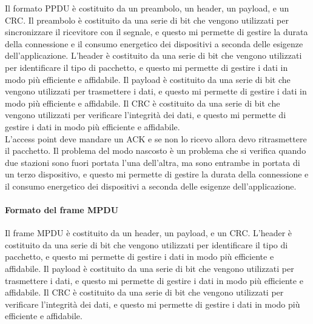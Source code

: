 Il formato PPDU è costituito da un preambolo, un header, un payload, e un CRC. Il preambolo è costituito da una serie di bit che vengono utilizzati per sincronizzare il ricevitore con il segnale, e questo mi permette di gestire la durata della connessione e il consumo energetico dei dispositivi a seconda delle esigenze dell'applicazione. L'header è costituito da una serie di bit che vengono utilizzati per identificare il tipo di pacchetto, e questo mi permette di gestire i dati in modo più efficiente e affidabile. Il payload è costituito da una serie di bit che vengono utilizzati per trasmettere i dati, e questo mi permette di gestire i dati in modo più efficiente e affidabile. Il CRC è costituito da una serie di bit che vengono utilizzati per verificare l'integrità dei dati, e questo mi permette di gestire i dati in modo più efficiente e affidabile.\\

L'access point deve mandare un ACK e se non lo ricevo allora devo ritrasmettere il pacchetto.
Il problema del modo nascosto è un problema che si verifica quando due stazioni sono fuori portata l'una dell'altra, ma sono entrambe in portata di un terzo dispositivo, e questo mi permette di gestire la durata della connessione e il consumo energetico dei dispositivi a seconda delle esigenze dell'applicazione.\\

\paragraph{Formato del frame MPDU}
Il frame MPDU è costituito da un header, un payload, e un CRC. L'header è costituito da una serie di bit che vengono utilizzati per identificare il tipo di pacchetto, e questo mi permette di gestire i dati in modo più efficiente e affidabile. Il payload è costituito da una serie di bit che vengono utilizzati per trasmettere i dati, e questo mi permette di gestire i dati in modo più efficiente e affidabile. Il CRC è costituito da una serie di bit che vengono utilizzati per verificare l'integrità dei dati, e questo mi permette di gestire i dati in modo più efficiente e affidabile.\\

